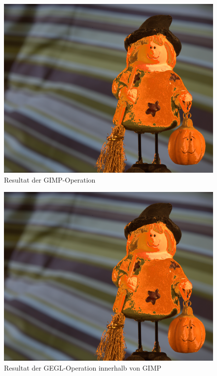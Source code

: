 \documentclass[10pt,a4paper]{article}
\begin{document}
\begin{figure}[H]
\centering
\includegraphics[scale=0.4]{img/matting-global_gimp.png}
\caption{Resultat der GIMP-Operation}
\label{fig:CE_gimp}
\end{figure}
\begin{figure}[H]
\centering
\includegraphics[scale=0.4]{img/matting-global_gegl_in_gimp.png}
\caption{Resultat der GEGL-Operation innerhalb von GIMP}
\label{fig:CE_gegl}
\end{figure}

\end{document}
